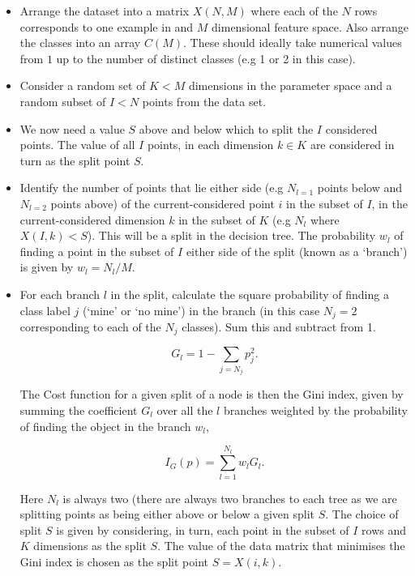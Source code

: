 \documentclass[10pt]{article}
\begin{document}
\begin{itemize}
\item Arrange the dataset into a matrix $X(N,M)$ where each of the $N$ rows corresponds to one example in and $M$ dimensional feature space. Also arrange the classes into an array $C(M)$. These should ideally take numerical values from $1$ up to the number of distinct classes (e.g 1 or 2 in this case).


\item Consider a random set of $K < M$ dimensions in the parameter space and a random subset of $I<N$ points from the data set. 

\item We now need a value $S$ above and below which to split the $I$ considered points. The value of all $I$ points, in each dimension $k \in K$ are considered in turn as the split point $S$.

\item Identify the number of points that lie either side (e.g $N_{l=1}$ points below and $N_{l=2}$ points above) of the current-considered point $i$ in the subset of $I$, in the current-considered dimension $k$ in the subset of $K$ (e.g $N_l$ where $X(I,k) < S$). This will be a split in the decision tree. The probability $w_l$ of finding a point in the subset of $I$ either side of the split (known as a `branch') is given by $w_l=N_l/M$.

\item For each branch $l$ in the split, calculate the square probability of finding a class label $j$ (`mine' or `no mine') in the branch (in this case $N_j=2$ corresponding to each of the $N_j$ classes). Sum this and subtract from 1.

\begin{equation}
G_l = 1 - \sum_{j=N_j}p_j^2.
\label{eq_gini1}
\end{equation}

The Cost function for a given split of a node is then the Gini index, given by summing the coefficient $G_l$ over all the $l$ branches weighted by the probability of finding the object in the branch $w_{l}$,

\begin{equation}
\label{eq_gini}
I_G(p) = \sum_{l=1}^{N_l} w_{l} G_{l}.
\end{equation}

\noindent Here $N_l$ is always two (there are always two branches to each tree as we are splitting points as being either above or below a given split $S$. The choice of split $S$ is given by considering, in turn, each point in the subset of $I$ rows and $K$ dimensions as the split $S$. The value of the data matrix that minimises the Gini index is chosen as the split point $S = X(i,k)$.



\end{itemize}
\end{document}
